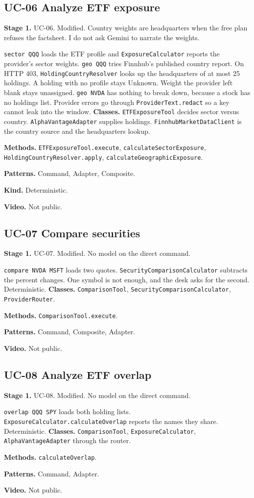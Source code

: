 \documentclass[11pt]{article}
\newcommand{\field}[2]{\textbf{#1.} #2\par}
\begin{document}
\subsection{UC-06 Analyze ETF exposure}
\field{Stage 1}{UC-06. Modified. Country weights are headquarters when the free plan refuses the factsheet. I do not ask Gemini to narrate the weights.}
\texttt{sector QQQ} loads the ETF profile and \texttt{ExposureCalculator} reports the provider's sector weights. \texttt{geo QQQ} tries Finnhub's published country report. On HTTP 403, \texttt{HoldingCountryResolver} looks up the headquarters of at most 25 holdings. A holding with no profile stays Unknown. Weight the provider left blank stays unassigned. \texttt{geo NVDA} has nothing to break down, because a stock has no holdings list. Provider errors go through \texttt{ProviderText.redact} so a key cannot leak into the window.
\field{Classes}{\texttt{ETFExposureTool} decides sector versus country. \texttt{AlphaVantageAdapter} supplies holdings. \texttt{FinnhubMarketDataClient} is the country source and the headquarters lookup.}
\field{Methods}{\texttt{ETFExposureTool.execute}, \texttt{calculateSectorExposure}, \texttt{HoldingCountryResolver.apply}, \texttt{calculateGeographicExposure}.}
\field{Patterns}{Command, Adapter, Composite.}
\field{Kind}{Deterministic.}
\field{Video}{Not public.}

\subsection{UC-07 Compare securities}
\field{Stage 1}{UC-07. Modified. No model on the direct command.}
\texttt{compare NVDA MSFT} loads two quotes. \texttt{SecurityComparisonCalculator} subtracts the percent changes. One symbol is not enough, and the desk asks for the second. Deterministic.
\field{Classes}{\texttt{ComparisonTool}, \texttt{SecurityComparisonCalculator}, \texttt{ProviderRouter}.}
\field{Methods}{\texttt{ComparisonTool.execute}.}
\field{Patterns}{Command, Composite, Adapter.}
\field{Video}{Not public.}

\subsection{UC-08 Analyze ETF overlap}
\field{Stage 1}{UC-08. Modified. No model on the direct command.}
\texttt{overlap QQQ SPY} loads both holding lists. \texttt{ExposureCalculator.calculateOverlap} reports the names they share. Deterministic.
\field{Classes}{\texttt{ComparisonTool}, \texttt{ExposureCalculator}, \texttt{AlphaVantageAdapter} through the router.}
\field{Methods}{\texttt{calculateOverlap}.}
\field{Patterns}{Command, Adapter.}
\field{Video}{Not public.}
\end{document}
